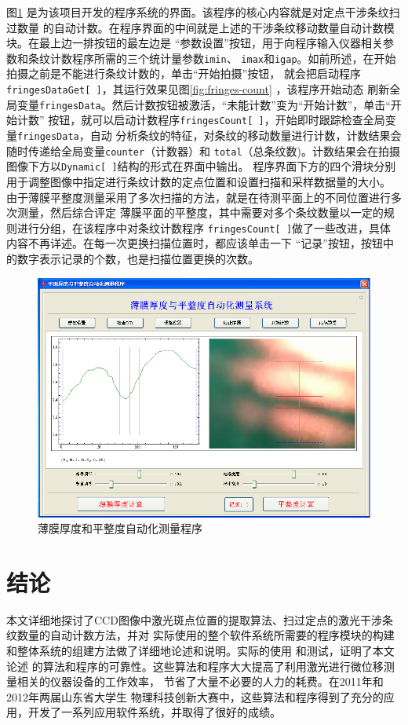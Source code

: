 \documentclass[UTF8,a4paper,12pt]{article}
\begin{document}
图\;\ref{fig:baomohoudu} 是为该项目开发的程序系统的界面。该程序的核心内容就是对定点干涉条纹扫过数量
的自动计数。在程序界面的中间就是上述的干涉条纹移动数量自动计数模块。在最上边一排按钮的最左边是
``参数设置''按钮，用于向程序输入仪器相关参数和条纹计数程序所需的三个统计量参数\verb|imin|、
\verb|imax|和\verb|igap|。如前所述，在开始拍摄之前是不能进行条纹计数的，单击``开始拍摄''按钮，
就会把启动程序\verb|fringesDataGet[ ]|，其运行效果见图\;\ref{fig:fringes-count} ，该程序开始动态
刷新全局变量\verb|fringesData|。然后计数按钮被激活，``未能计数''变为``开始计数''，单击``开始计数''
按钮，就可以启动计数程序\verb|fringesCount[ ]|，开始即时跟踪检查全局变量\verb|fringesData|，自动
分析条纹的特征，对条纹的移动数量进行计数，计数结果会随时传递给全局变量\verb|counter|（计数器）和
\verb|total|（总条纹数)。计数结果会在拍摄图像下方以\verb|Dynamic[ ]|结构的形式在界面中输出。
程序界面下方的四个滑块分别用于调整图像中指定进行条纹计数的定点位置和设置扫描和采样数据量的大小。
由于薄膜平整度测量采用了多次扫描的方法，就是在待测平面上的不同位置进行多次测量，然后综合评定
薄膜平面的平整度，其中需要对多个条纹数量以一定的规则进行分组，在该程序中对条纹计数程序
\verb|fringesCount[ ]|做了一些改进，具体内容不再详述。在每一次更换扫描位置时，都应该单击一下
``记录''按钮，按钮中的数字表示记录的个数，也是扫描位置更换的次数。


\begin{figure}[htbp]
\centering
\includegraphics[width=115mm]{image/baomohoudu.pdf}
\caption{薄膜厚度和平整度自动化测量程序}\label{fig:baomohoudu}
\end{figure}



\section{结论}
本文详细地探讨了CCD图像中激光斑点位置的提取算法、扫过定点的激光干涉条纹数量的自动计数方法，并对
实际使用的整个软件系统所需要的程序模块的构建和整体系统的组建方法做了详细地论述和说明。实际的使用
和测试，证明了本文论述
的算法和程序的可靠性。这些算法和程序大大提高了利用激光进行微位移测量相关的仪器设备的工作效率，
节省了大量不必要的人力的耗费。在2011年和2012年两届山东省大学生
物理科技创新大赛中，这些算法和程序得到了充分的应用，开发了一系列应用软件系统，并取得了很好的成绩。
\end{document}
